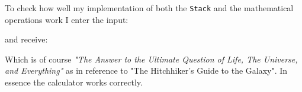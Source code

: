 \documentclass[a4paper,11pt]{article}
\begin{document}
To check how well my implementation of both the {\tt Stack} and the mathematical operations work I enter the input:

\begin{figure}[H]
\noindent{}
\end{figure}

and receive:

\begin{figure}[H]
\noindent{}
\end{figure}

Which is of course \emph{"The Answer to the Ultimate Question of Life, The Universe, and Everything"} as in reference to "The Hitchhiker's Guide to the Galaxy". In essence the calculator works correctly.
\end{document}

